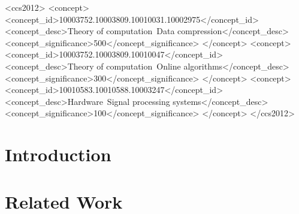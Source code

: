 \documentclass[sigconf]{acmart}  %
\begin{document}


\begin{CCSXML}
<ccs2012>
<concept>
<concept_id>10003752.10003809.10010031.10002975</concept_id>
<concept_desc>Theory of computation~Data compression</concept_desc>
<concept_significance>500</concept_significance>
</concept>
<concept>
<concept_id>10003752.10003809.10010047</concept_id>
<concept_desc>Theory of computation~Online algorithms</concept_desc>
<concept_significance>300</concept_significance>
</concept>
<concept>
<concept_id>10010583.10010588.10003247</concept_id>
<concept_desc>Hardware~Signal processing systems</concept_desc>
<concept_significance>100</concept_significance>
</concept>
</ccs2012>
\end{CCSXML}



\maketitle

\section{Introduction} \label{sec:intro}




% 

\section{Related Work} \label{sec:relatedWork}
\end{document}

